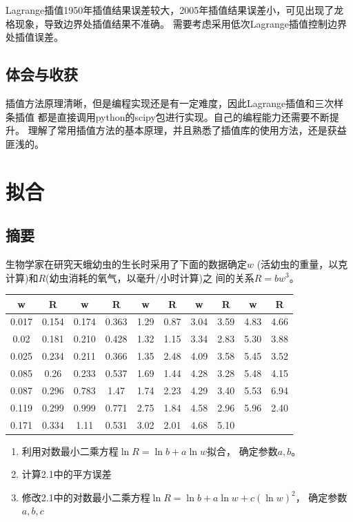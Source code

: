 \documentclass{article}
\begin{document}
Lagrange插值1950年插值结果误差较大，2005年插值结果误差小，可见出现了龙格现象，导致边界处插值结果不准确。
需要考虑采用低次Lagrange插值控制边界处插值误差。

\subsection{体会与收获}
插值方法原理清晰，但是编程实现还是有一定难度，因此Lagrange插值和三次样条插值
都是直接调用python的scipy包进行实现。自己的编程能力还需要不断提升。
理解了常用插值方法的基本原理，并且熟悉了插值库的使用方法，还是获益匪浅的。

\newpage
\section{拟合}
\subsection{摘要}
生物学家在研究天蛾幼虫的生长时采用了下面的数据确定$w$
(活幼虫的重量，以克计算)和$R$(幼虫消耗的氧气，以毫升/小时计算)之
间的关系$R=bw^3$。
\begin{table}[!ht]
    \centering
    \begin{tabular}{|c|c|c|c|c|c|c|c|c|c|}
    \hline
        w & R & w & R & w & R & w & R & w & R \\ \hline
        0.017 & 0.154 & 0.174 & 0.363 & 1.29 & 0.87 & 3.04 & 3.59 & 4.83 & 4.66 \\ \hline
        0.02 & 0.181 & 0.210  & 0.428 & 1.32 & 1.15 & 3.34 & 2.83 & 5.30  & 3.88 \\ \hline
        0.025 & 0.234 & 0.211 & 0.366 & 1.35 & 2.48 & 4.09 & 3.58 & 5.45 & 3.52 \\ \hline
        0.085 & 0.26 & 0.233 & 0.537 & 1.69 & 1.44 & 4.28 & 3.28 & 5.48 & 4.15 \\ \hline
        0.087 & 0.296 & 0.783 & 1.47 & 1.74 & 2.23 & 4.29 & 3.40  & 5.53 & 6.94 \\ \hline
        0.119 & 0.299 & 0.999 & 0.771 & 2.75 & 1.84 & 4.58 & 2.96 & 5.96 & 2.40  \\ \hline
        0.171 & 0.334 & 1.11 & 0.531 & 3.02 & 2.01 & 4.68 & 5.10 & & \\ \hline
    \end{tabular}
\end{table}
\begin{enumerate}
    \item 利用对数最小二乘方程\texorpdfstring{$\ln R=\ln b+a\ln w$}{}拟合，
        确定参数\texorpdfstring{$a,b$}{}。
    \item 计算2.1中的平方误差
    \item 修改2.1中的对数最小二乘方程\texorpdfstring{$\ln R=\ln b+a\ln w+c(\ln w)^2$}{}，
        确定参数\texorpdfstring{$a,b,c$}{} 
\end{enumerate}
\end{document}
